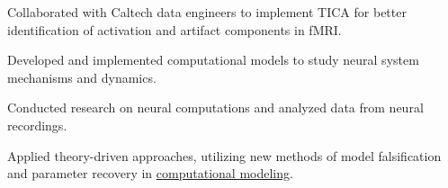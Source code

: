 \documentclass[]{plushcv}
\begin{document}
\begin{minipage}[t]{0.70\textwidth}
\sectionsep
{}
\begin{tightemize}
\item Collaborated with Caltech data engineers to implement TICA for better identification of activation and artifact components in fMRI.
\item Developed and implemented computational models to study neural system mechanisms and dynamics.
\item Conducted research on neural computations and analyzed data from neural recordings.
\item Applied theory-driven approaches, utilizing new methods of model falsification and parameter recovery in \href{https://github.com/munoztd0/Computational-Modelling}{\underline{computational modeling}}.
\end{tightemize}
\sectionsep






\end{minipage}
\end{document}

